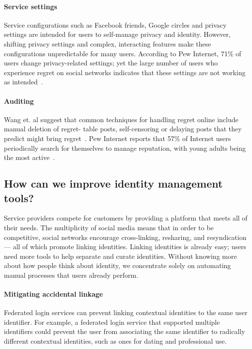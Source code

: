 \documentclass[10pt, conference, compsocconf]{IEEEtran}
\begin{document}
\paragraph{Service settings} Service configurations such as Facebook friends,
Google circles and privacy settings are intended for users to self-manage
privacy and identity. However, shifting privacy settings and complex,
interacting features make these configurations unpredictable for many users.
According to Pew Internet, 71\% of users change privacy-related settings; yet
the large number of users who experience regret on social networks indicates
that these settings are not working as intended~\cite{pew3}.

\paragraph{Auditing} Wang et. al suggest that common techniques
for handling regret online include manual deletion of regret- table posts,
self-censoring or delaying posts that they predict might bring
regret~\cite{wang}. Pew Internet reports that 57\% of Internet users
periodically search for themselves to manage reputation, with young adults
being the most active~\cite{pew3}.

\subsection{How can we improve identity management tools?}

Service providers compete for customers by providing a platform that
meets all of their needs.  The multiplicity of social media means that
in order to be competitive, social networks encourage cross-linking,
resharing, and resyndication --- all of which promote linking identities.
Linking identities is already easy;
users need more tools to help separate and curate identities. Without
knowing more about how people think about identity, we concentrate solely on
automating manual processes that users already perform.

\paragraph{Mitigating accidental linkage} Federated login services can prevent
linking contextual identities to the same user identifier. For example, a
federated login service that supported multiple identifiers could prevent the
user from associating the same identifier to radically different
contextual identities, such as ones for dating and professional use.
\end{document}
